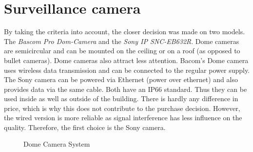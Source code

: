 \section{Surveillance camera}
By taking the criteria into account, the closer decision was made on two models. The \textit{Bascom Pro Dom-Camera} and the \textit{Sony IP SNC-EB632R}. Dome cameras are semicircular and can be mounted on the ceiling or on a roof (as opposed to bullet cameras). Dome cameras also attract less attention. Bacom's Dome camera uses wireless data transmission and can be connected to the regular power supply. The Sony camera can be powered via Ethernet (power over ethernet) and also provides data via the same cable. Both have an IP66 standard. Thus they can be used inside as well as outside of the building. There is hardly any difference in price, which is why this does not contribute to the purchase decision. However, the wired version is more reliable as signal interference has less influence on the quality. Therefore, the first choice is the Sony camera.
\begin{figure}[h]%
	\centering 
	 \hspace{1cm}
	\caption[Dome Camera System]{Dome Camera System\footnotemark}%
	\label{fig:domeCameraSystem}%
\end{figure}
